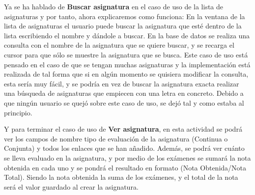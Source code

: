 Ya se ha hablado de \textbf{Buscar asignatura} en el caso de uso de la lista de asignaturas y por tanto, ahora explicaremos como funciona:
En la ventana de la lista de asignaturas el usuario puede buscar la asignatura que esté dentro de la lista escribiendo el nombre y dándole a buscar.
En la base de datos se realiza una consulta con el nombre de la asignatura que se quiere buscar, y se recarga el cursor para que sólo se muestre la asignatura que se busca.
Este caso de uso está pensado en el caso de que se tengan muchas asignaturas y la implementación está realizada de tal forma que si en algún momento se quisiera modificar la consulta, esta sería muy fácil, y se podría en vez de buscar la asignatura exacta realizar una búsqueda de asignaturas que empiecen con una letra en concreto.
Debido a que ningún usuario se quejó sobre este caso de uso, se dejó tal y como estaba al principio.

Y para terminar el caso de uso de \textbf{Ver asignatura}, en esta actividad se podrá ver los campos de nombre tipo de evaluación de la asignatura (Continua o Conjunta) y todos los enlaces que se han añadido. Además, se podrá ver cuánto se lleva evaluado en la asignatura, y por medio de los exámenes se sumará la nota obtenida en cada uno y se pondrá el resultado en formato (Nota Obtenida/Nota Total).
Siendo la nota obtenida la suma de los exámenes, y el total de la nota será el valor guardado al crear la asignatura.



